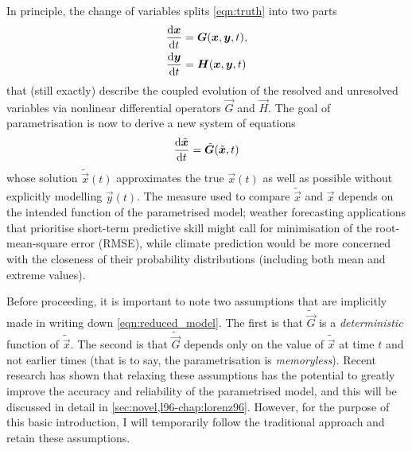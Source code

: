 \documentclass[../main.tex]{subfiles}
\begin{document}
In principle, the change of variables splits \cref{eqn:truth}
into two parts
\begin{align*}
    \frac{\mathrm{d} \bm{x}}{\mathrm{d} t} &= \bm{G}(\bm{x},\bm{y},t), \\
    \frac{\mathrm{d} \bm{y}}{\mathrm{d} t} &= \bm{H}(\bm{x},\bm{y},t)
\end{align*}
that (still exactly) describe the coupled evolution of the resolved and
unresolved variables via nonlinear differential operators $\vec{G}$ and
$\vec{H}$. The goal of parametrisation is now to derive a new system of
equations
\begin{equation} \label{eqn:reduced_model}
    \frac{\mathrm{d} \tilde{\bm{x}}}{\mathrm{d} t} = \tilde{\bm{G}}(\tilde{\bm{x}},t)
\end{equation}
whose solution $\tilde{\vec{x}}(t)$ approximates the true $\vec{x}(t)$ as well
as possible without explicitly modelling $\vec{y}(t)$. The measure used to
compare $\tilde{\vec{x}}$ and $\vec{x}$ depends on the intended function of the
parametrised model; weather forecasting applications that prioritise short-term
predictive skill might call for minimisation of the root-mean-square error
(RMSE), while climate prediction would be more concerned with the closeness of
their probability distributions (including both mean and extreme values).

Before proceeding, it is important to note two assumptions that are implicitly
made in writing down \cref{eqn:reduced_model}. The first is that
$\tilde{\vec{G}}$ is a \emph{deterministic} function of $\tilde{\vec{x}}$. The
second is that $\tilde{\vec{G}}$ depends only on the value of $\tilde{\vec{x}}$
at time $t$ and not earlier times (that is to say, the parametrisation is
\emph{memoryless}). Recent research has shown that relaxing these assumptions
has the potential to greatly improve the accuracy and reliability of the
parametrised model, and this will be discussed in detail in
\cref{sec:novel,l96-chap:lorenz96}. However, for the purpose of this basic
introduction, I will temporarily follow the traditional approach and retain
these assumptions.
\end{document}
